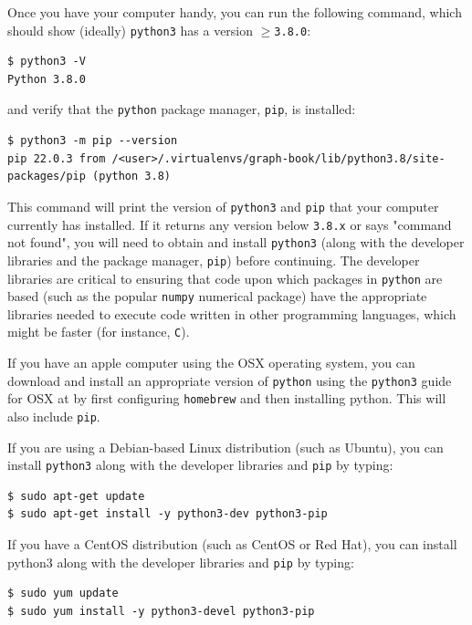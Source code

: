 Once you have your computer handy, you can run the following command, which should show (ideally) \texttt{python3} has a version $\geq$\texttt{3.8.0}:

\begin{lstlisting}[style=bash]
$ python3 -V
Python 3.8.0
\end{lstlisting}

and verify that the \texttt{python} package manager, \texttt{pip}, is installed:

\begin{lstlisting}[style=bash]
$ python3 -m pip --version
pip 22.0.3 from /<user>/.virtualenvs/graph-book/lib/python3.8/site-packages/pip (python 3.8)
\end{lstlisting}

This command will print the version of \texttt{python3} and \texttt{pip} that your computer currently has installed. If it returns any version below \texttt{3.8.x} or says "command not found", you will need to obtain and install \texttt{python3} (along with the developer libraries and the package manager, \texttt{pip}) before continuing. The developer libraries are critical to ensuring that code upon which packages in \texttt{python} are based (such as the popular \texttt{numpy} numerical package) have the appropriate libraries needed to execute code written in {other} programming languages, which might be faster (for instance, \texttt{C}). 

If you have an apple computer using the OSX operating system, you can download and install an appropriate version of \texttt{python} using the \texttt{python3} guide for OSX at \cite{pythonmac} by first configuring \texttt{homebrew} and then installing python. This will also include \texttt{pip}. 

If you are using a Debian-based Linux distribution (such as Ubuntu), you can install \texttt{python3} along with the developer libraries and \texttt{pip} by typing:

\begin{lstlisting}[style=bash]
$ sudo apt-get update
$ sudo apt-get install -y python3-dev python3-pip
\end{lstlisting}

If you have a CentOS distribution (such as CentOS or Red Hat), you can install python3 along with the developer libraries and \texttt{pip} by typing:

\begin{lstlisting}[style=bash]
$ sudo yum update
$ sudo yum install -y python3-devel python3-pip
\end{lstlisting}

